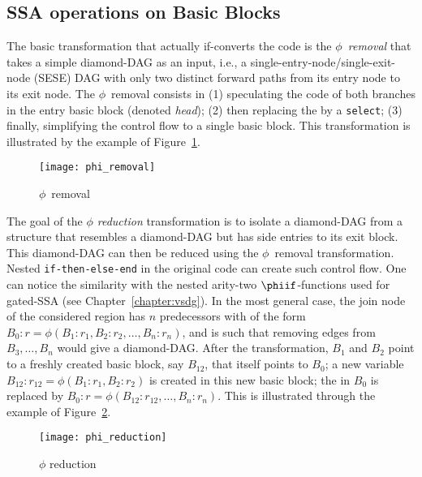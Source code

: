 \subsection{SSA operations on Basic Blocks}

The basic transformation that actually if-converts the code is the \emph{$\phi$~removal} that takes a simple diamond-DAG as an input, i.e., a single-entry-node/single-exit-node (SESE) DAG with only two distinct forward paths from its entry node to its exit node. 
The $\phi$~removal consists in (1) speculating the code of both branches in the entry basic block (denoted \textit{head}); 
(2) then replacing the \phifun by a \texttt{select}; 
(3) finally, simplifying the control flow to a single basic block. 
This transformation is illustrated by the example of Figure~\ref{fig:phi_rem}.
\begin{figure}[h]
  \texttt{[image: phi\_removal]}
  \caption{$\phi$~removal\label{fig:phi_rem}}
\end{figure}

The goal of the \emph{$\phi$ reduction} transformation is to isolate a diamond-DAG from a structure that resembles a diamond-DAG but has side entries to its exit block. 
This diamond-DAG can then be reduced using the $\phi$~removal transformation. 
Nested \texttt{if-then-else-end} in the original code can create such control flow. 
One can notice the similarity with the nested arity-two $\phiif$-functions used for gated-SSA (see Chapter~\ref{chapter:vsdg}). 
In the most general case, the join node of the considered region has $n$ predecessors with \phifuns of the form $B_0:r=\phi(B_1:r_1,B_2:r_2,\dots,B_n:r_n)$, and is such that removing edges from $B_3,\dots, B_n$ would give a diamond-DAG. 
After the transformation, $B_1$ and $B_2$ point to a freshly created basic block, say $B_{12}$, that itself points to $B_0$; 
a new variable $B_{12}:r_{12}=\phi(B_1:r_1,B_2:r_2)$ is created in this new basic block; 
the \phifun in $B_0$ is replaced by $B_0:r=\phi(B_{12}:r_{12},\dots,B_n:r_n)$. 
This is illustrated through the example of Figure~\ref{fig:phi_red}.
\begin{figure}[h]
  \texttt{[image: phi\_reduction]}
  \caption{\label{fig:phi_red}$\phi$ reduction}
\end{figure}

